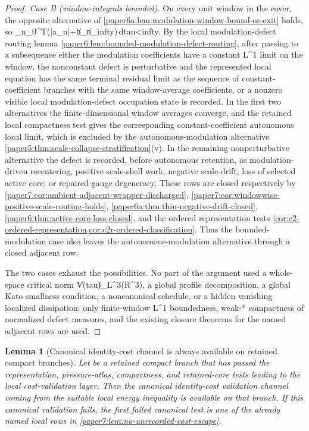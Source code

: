 \documentclass[11pt]{amsart}
\def\({}%
\def\){}%
\def\mathbb#1{#1}%
\def\tau{tau}%
\def\infty{infty}%
\theoremstyle{plain}
\newtheorem{lemma}[lemma]{Lemma}
\theoremstyle{definition}
\theoremstyle{remark}
\begin{document}
\begin{proof}
\smallskip\noindent\emph{Case B (window-integrals bounded).}  On every unit
window in the cover, the opposite alternative of
\cref{paper6a:lem:modulation-window-bound-or-exit} holds, so
\(\sup_n\int_0^T(|a_n|+\|b_n\|_\infty)\,d\tau<\infty\).  By the
local modulation-defect routing lemma
\cref{paper6:lem:bounded-modulation-defect-routing}, after passing to a
subsequence either the modulation coefficients have a constant \(L^1\) limit on
the window, the nonconstant defect is perturbative and the represented local
equation has the same terminal residual limit as the sequence of
constant-coefficient branches with the same window-average coefficients, or a
nonzero visible local modulation-defect occupation state is recorded.  In the
first two alternatives the finite-dimensional window averages converge, and the
retained local compactness test gives the corresponding constant-coefficient
autonomous local limit, which is excluded by the autonomous-modulation
alternative
\cref{paper5:thm:scale-collapse-stratification}\textup{(v)}.  In the remaining
nonperturbative alternative the defect is recorded, before autonomous retention, as
modulation-driven recentering, positive scale-shell work, negative scale-drift,
loss of selected active core, or repaired-gauge degeneracy.  These rows are
closed respectively by
\cref{paper7:cor:ambient-adjacent-wrapper-discharged},
\cref{paper7:cor:windowwise-positive-scale-routing-holds},
\cref{paper6a:thm:thin-negative-drift-closed},
\cref{paper6:thm:active-core-loss-closed}, and the ordered representation
tests
\cref{cor:c2-ordered-representation,cor:c2r-ordered-classification}.
Thus the bounded-modulation case also leaves the autonomous-modulation
alternative through a closed adjacent row.

The two cases exhaust the possibilities.  No part of the argument used a
whole-space critical norm \(\|V(\tau)\|_{L^3(\mathbb R^3)}\), a global
profile decomposition, a global Kato smallness condition, a noncanonical
schedule, or a hidden vanishing localized dissipation: only finite-window
\(L^1\) boundedness, weak-\(*\) compactness of normalized defect measures, and
the existing closure theorems for the named adjacent rows are used.
\end{proof}

\begin{lemma}[Canonical identity-cost channel is always available on retained compact branches]
\label{paper6:lem:canonical-identity-cost-available}
\label{paper6:lem:canonical-cost-channel-available}
\label{paper6:lem:canonical-cost-available}
Let \(\omega\) be a retained compact branch that has passed the representation,
pressure-atlas, compactness, and retained-core tests leading to the local
cost-validation layer.  Then the canonical identity-cost validation channel
coming from the suitable local energy inequality is available on that branch.
If this canonical validation fails, the first failed canonical test is one of
the already named local rows in
\cref{paper7:lem:no-unrecorded-cost-escape}.
\end{lemma}
\end{document}

